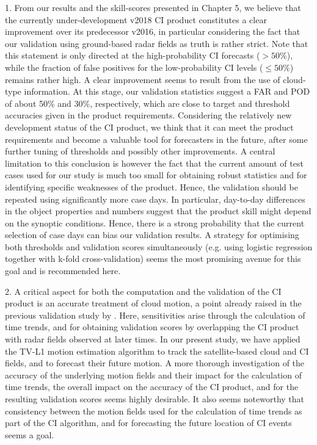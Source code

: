 1. From our results and the skill-scores presented in Chapter 5, we believe that the currently under-development v2018 CI product constitutes a clear improvement over its predecessor v2016, in particular considering the fact that our validation using ground-based radar fields as truth is rather strict. Note that this statement is only directed at the high-probability CI forecasts ($>50\%$), while the fraction of false positives for the low-probability CI levels ($\leq50\%$) remains rather high. A clear improvement seems to result from the use of cloud-type information. At this stage, our validation statistics suggest a FAR and POD of about 50\% and 30\%, respectively, which are close to target and threshold accuracies given in the product requirements. Considering the relatively new development status of the CI product, we think that it can meet the product requirements and become a valuable tool for forecasters in the future, after some further tuning of thresholds and possibly other improvements. A central limitation to this conclusion is however the fact that the current amount of test cases used for our study is much too small for obtaining robust statistics and for identifying specific weaknesses of the product. Hence, the validation should be repeated using significantly more case days. In particular, day-to-day differences in the object properties and numbers suggest that the product skill might depend  on the synoptic conditions. Hence, there is a strong probability that the current selection of case days can bias our validation results. A strategy for optimising both thresholds  and validation scores simultaneously (e.g. using logistic regression together with k-fold cross-validation) seems the most promising avenue for this goal and is recommended here.

2. A critical aspect for both the computation and the validation of the CI product is an accurate treatment of cloud motion, a point already raised in the previous validation study by \citet{Karagiannidis2016}. Here, sensitivities arise through the calculation of time trends, and for obtaining validation scores by overlapping the CI product with radar fields observed at later times. In our present study, we have applied the TV-L1 motion estimation algorithm to track the satellite-based cloud and CI fields, and to forecast their future motion. A more thorough investigation of the accuracy of the underlying motion fields and their impact for the calculation of time trends, the overall impact on the accuracy of the CI product, and for the resulting validation scores seems highly desirable. It also seems noteworthy that consistency between the motion fields used for the calculation of time trends as part of the CI algorithm, and for forecasting the future location of CI events seems a goal.  

